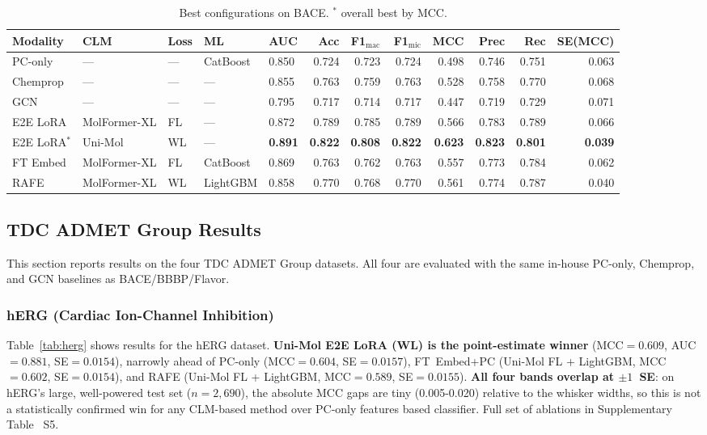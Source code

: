 \documentclass[final,1p,times]{elsarticle}
\begin{document}
\begin{table}[ht]
\centering
\caption{Best configurations on BACE. $^*$ overall best by MCC.}
\label{tab:bace}
\begin{adjustbox}{max width=\textwidth}
\begin{tabular}{lllllrrrrrrr}
\toprule
Modality & CLM & Loss & ML & AUC & Acc & F1$_\text{mac}$ & F1$_\text{mic}$ & MCC & Prec & Rec & SE(MCC) \\
\midrule
PC-only    & --- & --- & CatBoost & 0.850 & 0.724 & 0.723 & 0.724 & 0.498 & 0.746 & 0.751 & 0.063 \\
Chemprop   & --- & --- & --- & 0.855 & 0.763 & 0.759 & 0.763 & 0.528 & 0.758 & 0.770 & 0.068 \\
GCN        & --- & --- & --- & 0.795 & 0.717 & 0.714 & 0.717 & 0.447 & 0.719 & 0.729 & 0.071 \\
\midrule
E2E LoRA   & MolFormer-XL & FL & --- & 0.872 & 0.789 & 0.785 & 0.789 & 0.566 & 0.783 & 0.789 & 0.066 \\
E2E LoRA$^*$ & Uni-Mol    & WL & --- & \textbf{0.891} & \textbf{0.822} & \textbf{0.808} & \textbf{0.822} & \textbf{0.623} & \textbf{0.823} & \textbf{0.801} & \textbf{0.039} \\
\midrule
FT Embed   & MolFormer-XL & FL & CatBoost & 0.869 & 0.763 & 0.762 & 0.763 & 0.557 & 0.773 & 0.784 & 0.062 \\
RAFE       & MolFormer-XL & WL & LightGBM & 0.858 & 0.770 & 0.768 & 0.770 & 0.561 & 0.774 & 0.787 & 0.040 \\
\bottomrule
\end{tabular}
\end{adjustbox}
\end{table}

\subsection{TDC ADMET Group Results}\label{sec:new_datasets}
This section reports results on the four TDC ADMET Group datasets. All four are evaluated with the same in-house PC-only, Chemprop, and GCN baselines as BACE/BBBP/Flavor.

\subsubsection{hERG (Cardiac Ion-Channel Inhibition)}
Table~\ref{tab:herg} shows results for the hERG dataset. \textbf{Uni-Mol E2E LoRA (WL) is the point-estimate winner} (MCC$=0.609$, AUC$=0.881$, SE$=0.0154$), narrowly ahead of PC-only (MCC$=0.604$, SE$=0.0157$), FT~Embed+PC (Uni-Mol FL + LightGBM, MCC$=0.602$, SE$=0.0154$), and RAFE (Uni-Mol FL + LightGBM, MCC$=0.589$, SE$=0.0155$). \textbf{All four bands overlap at $\pm 1$~SE}: on hERG's large, well-powered test set ($n=2{,}690$), the absolute MCC gaps are tiny (0.005-0.020) relative to the whisker widths, so this is not a statistically confirmed win for any CLM-based method over PC-only features based classifier. Full set of ablations in Supplementary Table ~S5.
\end{document}

